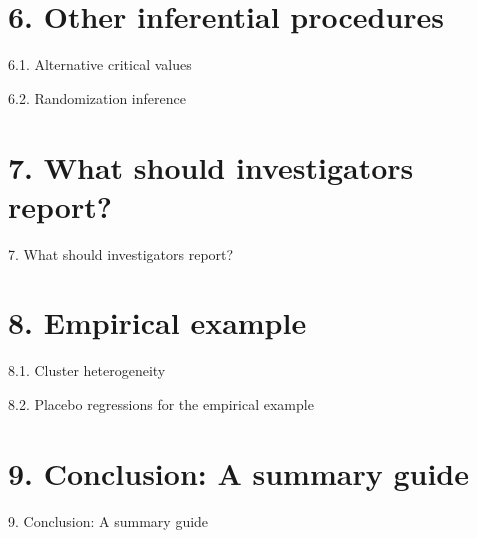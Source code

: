 \documentclass[xcolor=svgnames,dvipdfmx,cjk,aspectratio=169]{beamer}
\begin{document}
\section{6. Other inferential procedures}

\begin{frame}{6.1. Alternative critical values}
\end{frame}

\begin{frame}{6.2. Randomization inference}
\end{frame}

\section{7. What should investigators report?}

\begin{frame}{7. What should investigators report?}
\end{frame}

\section{8. Empirical example}

\begin{frame}{8.1. Cluster heterogeneity}
\end{frame}

\begin{frame}{8.2. Placebo regressions for the empirical example}
\end{frame}

\section{9. Conclusion: A summary guide}

\begin{frame}{9. Conclusion: A summary guide}
\end{frame}
\end{document}
